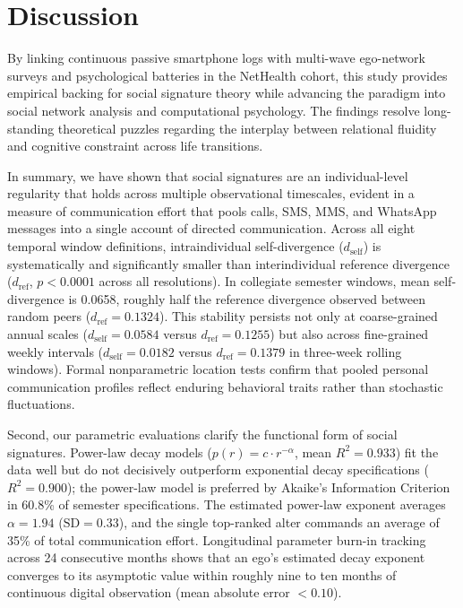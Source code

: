 \documentclass[11pt,letterpaper]{article}
\newcommand{\dself}{d_{\mathrm{self}}}
\newcommand{\dref}{d_{\mathrm{ref}}}
\begin{document}
\section{Discussion}

By linking continuous passive smartphone logs with multi-wave ego-network surveys and psychological batteries in the NetHealth cohort, this study provides empirical backing for social signature theory while advancing the paradigm into social network analysis and computational psychology. The findings resolve long-standing theoretical puzzles regarding the interplay between relational fluidity and cognitive constraint across life transitions.

In summary, we have shown that social signatures are an individual-level regularity that holds across multiple observational timescales, evident in a measure of communication effort that pools calls, SMS, MMS, and WhatsApp messages into a single account of directed communication. Across all eight temporal window definitions, intraindividual self-divergence ($\dself$) is systematically and significantly smaller than interindividual reference divergence ($\dref$, $p < 0.0001$ across all resolutions). In collegiate semester windows, mean self-divergence is 0.0658, roughly half the reference divergence observed between random peers ($\dref = 0.1324$). This stability persists not only at coarse-grained annual scales ($\dself = 0.0584$ versus $\dref = 0.1255$) but also across fine-grained weekly intervals ($\dself = 0.0182$ versus $\dref = 0.1379$ in three-week rolling windows). Formal nonparametric location tests confirm that pooled personal communication profiles reflect enduring behavioral traits rather than stochastic fluctuations.

Second, our parametric evaluations clarify the functional form of social signatures. Power-law decay models ($p(r) = c \cdot r^{-\alpha}$, mean $R^2 = 0.933$) fit the data well but do not decisively outperform exponential decay specifications ($R^2 = 0.900$); the power-law model is preferred by Akaike's Information Criterion in 60.8\% of semester specifications. The estimated power-law exponent averages $\alpha = 1.94$ ($\text{SD} = 0.33$), and the single top-ranked alter commands an average of 35\% of total communication effort. Longitudinal parameter burn-in tracking across 24 consecutive months shows that an ego's estimated decay exponent converges to its asymptotic value within roughly nine to ten months of continuous digital observation (mean absolute error $< 0.10$).
\end{document}
